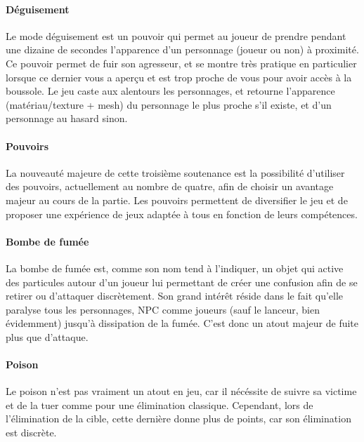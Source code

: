 		\paragraph{Déguisement}

			Le mode déguisement est un pouvoir qui permet au joueur de prendre pendant une dizaine de secondes l'apparence 
			d'un personnage (joueur ou non) à proximité. Ce pouvoir permet de fuir son agresseur, et se montre très pratique 
			en particulier lorsque ce dernier vous a aperçu et est trop proche de vous pour avoir accès à la boussole. 
			Le jeu caste aux alentours les personnages, et retourne l'apparence (matériau/texture + mesh) du 
			personnage le plus proche s'il existe, et d'un personnage au hasard sinon.

		\paragraph{Pouvoirs}

			La nouveauté majeure de cette troisième soutenance est la possibilité d'utiliser des pouvoirs, actuellement au 
			nombre de quatre, afin de choisir un avantage majeur au cours de la partie. Les pouvoirs permettent de diversifier 
			le jeu et de proposer une expérience de jeux adaptée à tous en fonction de leurs compétences.

		\paragraph{Bombe de fumée}

			La bombe de fumée est, comme son nom tend à l'indiquer, un objet qui active des particules autour d'un joueur lui 
			permettant de créer une confusion afin de se retirer ou d'attaquer discrètement. Son grand intérêt réside dans le fait 
			qu'elle paralyse tous les personnages, NPC comme joueurs (sauf le lanceur, bien évidemment) jusqu'à dissipation de la fumée. 
			C'est donc un atout majeur de fuite plus que d'attaque.

		\paragraph{Poison}

			Le poison n'est pas vraiment un atout en jeu, car il nécéssite de suivre sa victime et de la tuer comme pour une 
			élimination classique. Cependant, lors de l'élimination de la cible, cette dernière donne plus de points, car son 
			élimination est discrète.
			
